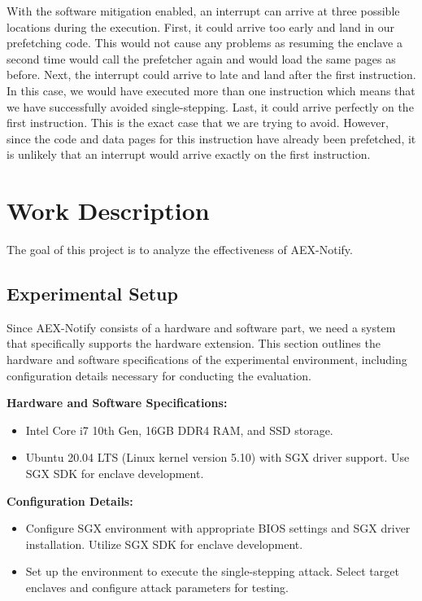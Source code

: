\documentclass{llncs}
\begin{document}
With the software mitigation enabled, an interrupt can arrive at three possible
locations during the execution.
First, it could arrive too early and land in our prefetching code.
This would not cause any problems as resuming the enclave a second time would
call the prefetcher again and would load the same pages as before.
Next, the interrupt could arrive to late and land after the first instruction.
In this case, we would have executed more than one instruction which means
that we have successfully avoided single-stepping.
Last, it could arrive perfectly on the first instruction.
This is the exact case that we are trying to avoid.
However, since the code and data pages for this instruction have already been prefetched,
it is unlikely that an interrupt would arrive exactly on the first instruction.


\section{Work Description}

The goal of this project is to analyze the effectiveness of AEX-Notify.

\subsection{Experimental Setup}

Since AEX-Notify consists of a hardware and software part,
we need a system that specifically supports the hardware extension.
This section outlines the hardware and software specifications of the experimental environment,
including configuration details necessary for conducting the evaluation.

\textbf{Hardware and Software Specifications:}
\begin{itemize}
  \item Intel Core i7 10th Gen, 16GB DDR4 RAM, and SSD storage.
  \item Ubuntu 20.04 LTS (Linux kernel version 5.10) with SGX driver support. Use SGX SDK for enclave development.
\end{itemize}

\textbf{Configuration Details:}
\begin{itemize}
  \item
    Configure SGX environment with appropriate BIOS settings and SGX driver installation.
    Utilize SGX SDK for enclave development.
  \item
    Set up the environment to execute the single-stepping attack.
    Select target enclaves and configure attack parameters for testing.
\end{itemize}
\end{document}

